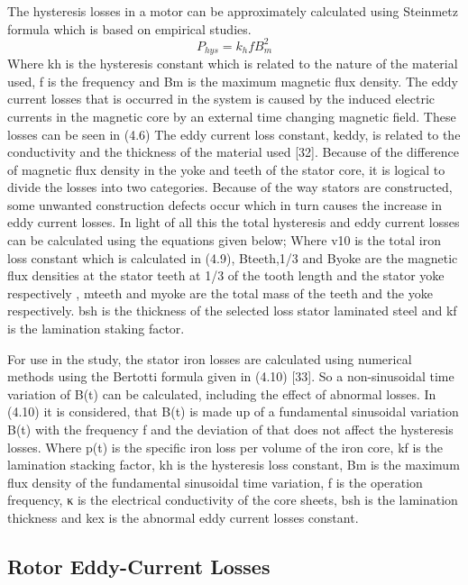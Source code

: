 The hysteresis losses in a motor can be approximately calculated using
Steinmetz formula which is based on empirical studies.
%
\begin{equation}\label{eq:mag-loss-5}
  P_{hys} =
  k_{h} f B_{m}^{2}
\end{equation}
%
Where kh is the hysteresis constant which is related to the nature of the
material used, f is the frequency and Bm is the maximum magnetic flux density.
The eddy current losses that is occurred in the system is caused by the
induced electric currents in the magnetic core by an external time changing magnetic
field. These losses can be seen in (4.6)
%
%
The eddy current loss constant, keddy, is related to the conductivity and the
thickness of the material used [32]. Because of the difference of magnetic flux
density in the yoke and teeth of the stator core, it is logical to divide the losses into
two categories. Because of the way stators are constructed, some unwanted
construction defects occur which in turn causes the increase in eddy current losses. In
light of all this the total hysteresis and eddy current losses can be calculated using the
equations given below;
%
%
Where v10 is the total iron loss constant which is calculated in (4.9), Bteeth,1/3
and Byoke are the magnetic flux densities at the stator teeth at 1/3 of the tooth length
and the stator yoke respectively , mteeth and myoke are the total mass of the teeth and
the yoke respectively. bsh is the thickness of the selected loss stator laminated steel
and kf is the lamination staking factor.

For use in the study, the stator iron losses are calculated using numerical
methods using the Bertotti formula given in (4.10) [33]. So a non-sinusoidal time
variation of B(t) can be calculated, including the effect of abnormal losses. In (4.10)
it is considered, that B(t) is made up of a fundamental sinusoidal variation B(t) with
the frequency f and the deviation of that does not affect the hysteresis losses.
%
% 
Where p(t) is the specific iron loss per volume of the iron core, kf is the lamination
stacking factor, kh is the hysteresis loss constant, Bm is the maximum flux density of
the fundamental sinusoidal time variation, f is the operation frequency, κ is the
electrical conductivity of the core sheets, bsh is the lamination thickness and kex is the
abnormal eddy current losses constant.

\subsection{Rotor Eddy-Current Losses} %

